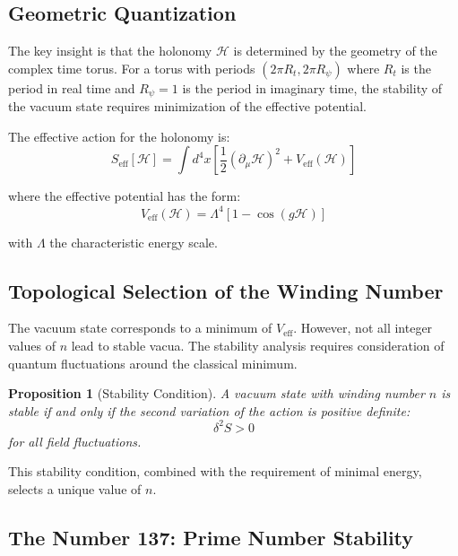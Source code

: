\documentclass[12pt, a4paper]{article}
\newtheorem{proposition}[theorem]{Proposition}
\theoremstyle{definition}
\theoremstyle{remark}
\begin{document}
\subsection{Geometric Quantization}

The key insight is that the holonomy $\mathcal{H}$ is determined by the geometry of the complex time torus. For a torus with periods $(2\pi R_t, 2\pi R_\psi)$ where $R_t$ is the period in real time and $R_\psi = 1$ is the period in imaginary time, the stability of the vacuum state requires minimization of the effective potential.

The effective action for the holonomy is:
\begin{equation}
S_{\text{eff}}[\mathcal{H}] = \int d^4x \left[ \frac{1}{2}(\partial_\mu \mathcal{H})^2 + V_{\text{eff}}(\mathcal{H}) \right]
\end{equation}

where the effective potential has the form:
\begin{equation}
V_{\text{eff}}(\mathcal{H}) = \Lambda^4 \left[1 - \cos(g\mathcal{H})\right]
\end{equation}

with $\Lambda$ the characteristic energy scale.

\subsection{Topological Selection of the Winding Number}

The vacuum state corresponds to a minimum of $V_{\text{eff}}$. However, not all integer values of $n$ lead to stable vacua. The stability analysis requires consideration of quantum fluctuations around the classical minimum.

\begin{proposition}[Stability Condition]
A vacuum state with winding number $n$ is stable if and only if the second variation of the action is positive definite:
\begin{equation}
\delta^2 S > 0
\end{equation}
for all field fluctuations.
\end{proposition}

This stability condition, combined with the requirement of minimal energy, selects a unique value of $n$.

\subsection{The Number 137: Prime Number Stability}
\end{document}
